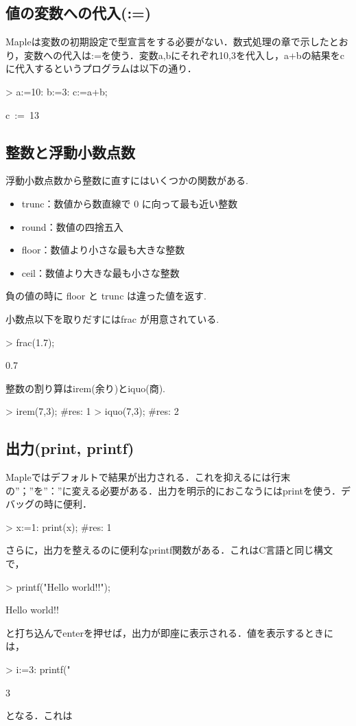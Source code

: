 \subsection{値の変数への代入(:=)}

Mapleは変数の初期設定で型宣言をする必要がない．数式処理の章で示したとおり，変数への代入は:=を使う．変数a,bにそれぞれ10,3を代入し，a+bの結果をc
に代入するというプログラムは以下の通り．
\begin{MapleInput}
> a:=10: b:=3: c:=a+b;
\end{MapleInput}
\begin{MapleOutput}
c\, := \,13
\end{MapleOutput}

\subsection{整数と浮動小数点数}
浮動小数点数から整数に直すにはいくつかの関数がある.
\begin{itemize}
\item trunc：数値から数直線で 0 に向って最も近い整数
\item round：数値の四捨五入
\item floor：数値より小さな最も大きな整数
\item ceil：数値より大きな最も小さな整数
\end{itemize}
負の値の時に floor と trunc は違った値を返す.

小数点以下を取りだすにはfrac が用意されている.
\begin{MapleInput}
> frac(1.7);
\end{MapleInput}
\begin{MapleOutput}
0.7
\end{MapleOutput}

整数の割り算はirem(余り)とiquo(商).
\begin{MapleInput}
> irem(7,3); #res: 1
> iquo(7,3); #res: 2
\end{MapleInput}

\subsection{出力(print, printf)}
Mapleではデフォルトで結果が出力される．これを抑えるには行末の”；”を”：”に変える必要がある．出力を明示的におこなうにはprintを使う．デバッグの時に便利．
\begin{MapleInput}
> x:=1: print(x); #res: 1
\end{MapleInput}
さらに，出力を整えるのに便利なprintf関数がある．これはC言語と同じ構文で，
\begin{MapleInput}
> printf("Hello world!!\n");
\end{MapleInput}
\begin{MapleError}
Hello world!!
\end{MapleError}
と打ち込んでenterを押せば，出力が即座に表示される．値を表示するときには，
\begin{MapleInput}
> i:=3: printf("%
\end{MapleInput}
\begin{MapleOutput}
3
\end{MapleOutput}
となる．これは

